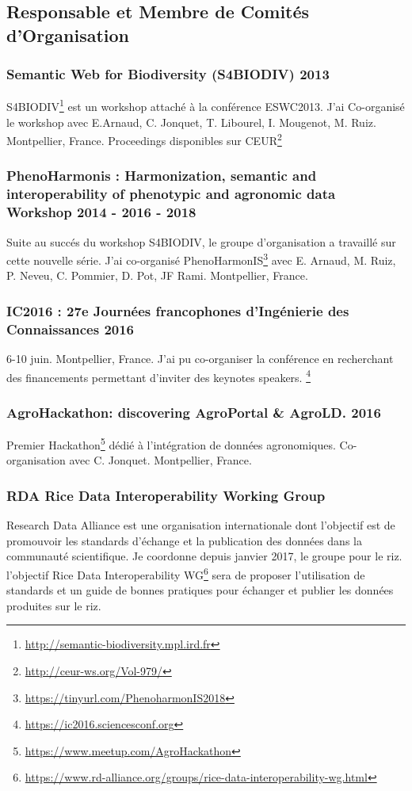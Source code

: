 \subsection*{Responsable et Membre de Comités d’Organisation}

\subsubsection*{Semantic Web for Biodiversity (S4BIODIV) 2013 } 
S4BIODIV\footnote{\url{http://semantic-biodiversity.mpl.ird.fr}} est un workshop attaché à la conférence ESWC2013. J'ai Co-organisé le workshop avec E.Arnaud, C. Jonquet, T. Libourel, I. Mougenot, M. Ruiz. Montpellier, France.  Proceedings disponibles sur CEUR\footnote{\url{http://ceur-ws.org/Vol-979/}}

\subsubsection*{PhenoHarmonis : Harmonization, semantic and interoperability of phenotypic and agronomic data Workshop 2014 - 2016 - 2018} Suite au succés du workshop S4BIODIV, le groupe d'organisation a travaillé sur cette nouvelle série.  J'ai co-organisé PhenoHarmonIS\footnote{\url{https://tinyurl.com/PhenoharmonIS2018}} avec E. Arnaud, M. Ruiz, P. Neveu, C. Pommier, D. Pot, JF Rami. Montpellier, France.


\subsubsection*{IC2016 : 27e Journées francophones d'Ingénierie des Connaissances  2016 } 6-10 juin. Montpellier, France.  J'ai pu co-organiser la conférence en recherchant des financements permettant d'inviter des keynotes speakers. 
 \footnote{\url{https://ic2016.sciencesconf.org}}

\subsubsection*{AgroHackathon: discovering AgroPortal \& AgroLD. 2016 } Premier Hackathon\footnote{\url{https://www.meetup.com/AgroHackathon}} dédié à l’intégration de données agronomiques. Co-organisation avec C. Jonquet. Montpellier, France.


\subsubsection*{RDA Rice Data Interoperability Working Group} Research Data Alliance est une organisation internationale dont l'objectif est de promouvoir les standards d’échange et la publication des données dans la communauté scientifique. Je coordonne depuis janvier 2017, le groupe pour le riz. l'objectif Rice Data Interoperability WG\footnote{\url{https://www.rd-alliance.org/groups/rice-data-interoperability-wg.html}} sera de proposer l’utilisation de standards et un guide de bonnes pratiques pour échanger et publier les données produites sur le riz. 


